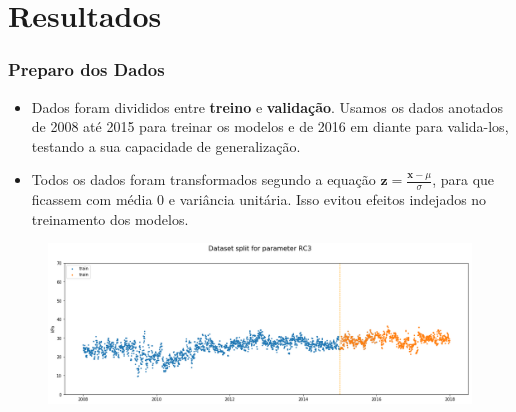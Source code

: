 \documentclass{beamer}
\begin{document}
\section{Resultados}

\begin{frame}
  \frametitle{Preparo dos Dados}
  \begin{itemize}
    \item Dados foram divididos entre \textbf{treino} e \textbf{validação}.
      Usamos os dados anotados de 2008 até 2015 para treinar os modelos e de
      2016 em diante para valida-los, testando a sua capacidade de
      generalização.
      
    \item Todos os dados foram transformados segundo a equação $\textbf{z} =
      \frac{\textbf{x} - \mu}{\sigma}$, para que ficassem com média 0 e
      variância unitária. Isso evitou efeitos indejados no treinamento dos modelos.
      
    \end{itemize}
    \begin{figure}[H]
  \centering
  \includegraphics[width=0.9\columnwidth]{split_2008-2015-2017RC3.png}
\end{figure}

\end{frame}
\end{document}
